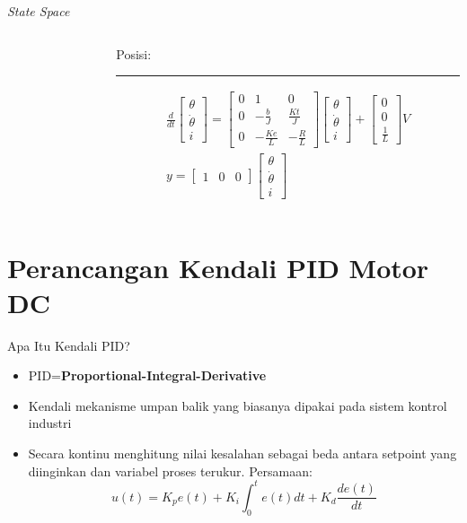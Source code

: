 \documentclass[10pt,xcolor={dvipsnames}]{beamer}
\begin{document}
\begin{frame}{\textit{State Space}}
\begin{columns}[T]
\begin{column}{0.5\textwidth}
				\end{column}%
				\hfill%
				\begin{column}{0.5\textwidth}
					Posisi:\newline
					\color{myNewColorA}\rule{\linewidth}{4pt}
					\begin{equation}
						\begin{split}
							\frac{d}{dt}
							\begin{bmatrix}
								\theta \\ \dot{\theta} \\ i
							\end{bmatrix}
							=
							\begin{bmatrix}
								0 & 1 & 0\\
								0 & -\frac{b}{J} & \frac{Kt}{J}\\
								0 & -\frac{Ke}{L} & -\frac{R}{L}
							\end{bmatrix}
							\begin{bmatrix}
								\theta \\ \dot{\theta} \\ i
							\end{bmatrix}
							+
							\begin{bmatrix}
								0 \\ 0 \\ \frac{1}{L}
							\end{bmatrix}
							V\\
							y=
							\begin{bmatrix}
								1 & 0 & 0
							\end{bmatrix}
							\begin{bmatrix}
								\theta \\ \dot{\theta} \\ i
							\end{bmatrix}
						\end{split}
					\end{equation}
				\end{column}
			\end{columns}
		\end{frame}
		
		\section{Perancangan Kendali PID Motor DC}
		\begin{frame}{Apa Itu Kendali PID?}
			\begin{itemize}
				\item PID=\textbf{Proportional-Integral-Derivative}
				\item Kendali mekanisme umpan balik yang biasanya dipakai pada sistem kontrol industri
				\item Secara kontinu menghitung nilai kesalahan sebagai beda antara setpoint yang diinginkan dan variabel proses terukur.
				Persamaan:
				\begin{equation}
					u(t)=K_{p}e(t)+K_{i}\int_{0}^{t}e(t)dt+K_{d}\frac{de(t)}{dt}
				\end{equation}
			\end{itemize}
		\end{frame}
		
\end{document}
